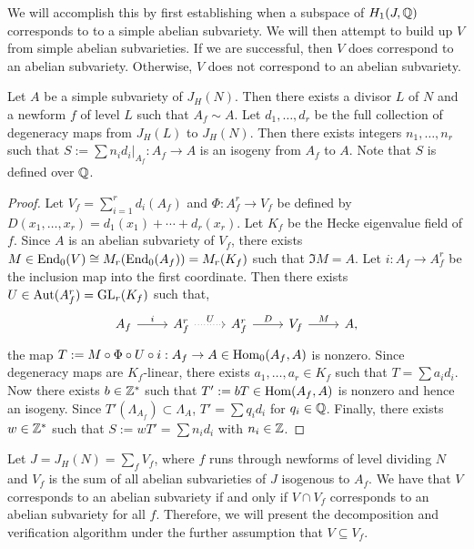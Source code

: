\documentclass{article}
\begin{document}
We will accomplish this by first establishing when a subspace of $H_1(J, \mathbb{Q})$
corresponds to to a simple abelian subvariety. We will then attempt to build up
$V$ from simple abelian subvarieties. If we are successful, then $V$ does
correspond to an abelian subvariety. Otherwise, $V$ does not correspond to an
abelian subvariety.

\begin{proposition}
    \label{prop:integral_degen}
    Let $A$ be a simple subvariety of $J_H(N)$. Then there exists a divisor $L$
    of $N$ and a newform $f$ of level $L$ such that $A_f \sim A$. Let
    $d_1,\ldots,d_r$ be the full collection of degeneracy maps from $J_H(L)$ to
    $J_H(N)$. Then there exists integers $n_1,\ldots,n_r$ such that $S:=\sum
    n_i d_i|_{A_f}: A_f\to A$ is an isogeny from $A_f$ to $A$. Note that $S$ is
    defined over $\mathbb{Q}$.
\end{proposition}
\begin{proof}
    Let $V_f=\sum_{i=1} ^r d_i(A_f)$ and $\Phi:A_f ^r \to V_f$ be defined by
    $D(x_1,\ldots,x_r) = d_1(x_1)+\cdots+d_r(x_r)$. Let $K_f$ be the Hecke
    eigenvalue field of $f$. Since $A$ is an abelian subvariety of $V_f$, there
    exists $M\in \operatorname{End}_0(V)\cong M_r(\operatorname{End}_0(A_f)) = M_r (K_f)$ such that $\Im M
    = A$. Let $i:A_f\to A_f ^r$ be the inclusion map into the first coordinate.
    Then there exists $U\in \operatorname{Aut}(A_f ^r)=\operatorname{GL}_r (K_f)$ such that,
    \[
        \begin{tikzcd}
            A_f \arrow[r,"i"] &
            A_f ^r \arrow[r, dotted, "U"] &
            A_f ^r \arrow[r, "D"] &
            V_f \arrow[r, "M"] &
            A,
        \end{tikzcd}
    \]
    the map $T:=M \circ \Phi \circ U\circ i:A_f\to A\in \operatorname{Hom}_0(A_f, A)$ is
    nonzero. Since degeneracy maps are $K_f$-linear, there exists
    $a_1,\ldots,a_r\in K_f$ such that $T = \sum a_i d_i$. Now there exists
    $b\in \mathbb{Z}^*$ such that $T':=bT\in \operatorname{Hom}(A_f, A)$ is nonzero and hence an
    isogeny. Since $T'(\Lambda_{A_f})\subset \Lambda_A$, $T'=\sum q_i d_i$
    for $q_i\in \mathbb{Q}$. Finally, there exists $w\in \mathbb{Z}^*$ such that
    $S:=wT'=\sum n_i d_i$ with $n_i\in \mathbb{Z}$.
\end{proof}

Let $J=J_H(N)=\sum_f V_f$, where $f$ runs through newforms of level dividing
$N$ and $V_f$ is the sum of all abelian subvarieties of $J$ isogenous to $A_f$.
We have that $V$ corresponds to an abelian subvariety if and only if $V\cap
V_f$ corresponds to an abelian subvariety for all $f$. Therefore, we will
present the decomposition and verification algorithm under the further
assumption that $V\subseteq V_f$.
\end{document}

